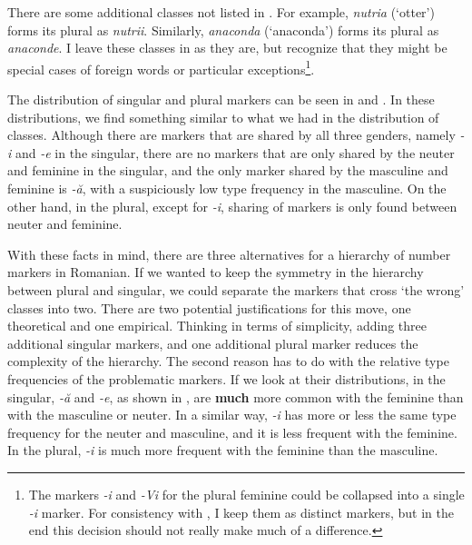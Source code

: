 There are some additional classes not listed in \textcite{Cojocaru.2003}. For example, \textit{nutria} (`otter') forms its plural as \textit{nutrii}. Similarly, \textit{anaconda} (`anaconda') forms its plural as \textit{anaconde}. I leave these classes in as they are, but recognize that they might be special cases of foreign words or particular exceptions\footnote{The markers \textit{-i} and \textit{-Vi} for the plural feminine could be collapsed into a single \textit{-i} marker. For consistency with \textcite{Cojocaru.2003}, I keep them as distinct markers, but in the end this decision should not really make much of a difference.}.

The distribution of singular and plural markers can be seen in  and . In these distributions, we find something similar to what we had in the distribution of classes. Although there are markers that are shared by all three genders, namely \textit{-i} and \textit{-e} in the singular, there are no markers that are only shared by the neuter and feminine in the singular, and the only marker shared by the masculine and feminine is \textit{-ă}, with a suspiciously low type frequency in the masculine. On the other hand, in the plural, except for \textit{-i}, sharing of markers is only found between neuter and feminine.

With these facts in mind, there are three alternatives for a hierarchy of number markers in Romanian. If we wanted to keep the symmetry in the hierarchy between plural and singular, we could separate the markers that cross `the wrong' classes into two. There are two potential justifications for this move, one theoretical and one empirical. Thinking in terms of simplicity, adding three additional singular markers, and one additional plural marker reduces the complexity of the hierarchy. The second reason has to do with the relative type frequencies of the problematic markers. If we look at their distributions, in the singular, \textit{-ă} and \textit{-e}, as shown in , are \textbf{much} more common with the feminine than with the masculine or neuter. In a similar way, \textit{-i} has more or less the same type frequency for the neuter and masculine, and it is less frequent with the feminine. In the plural, \textit{-i} is much more frequent with the feminine than the masculine.

